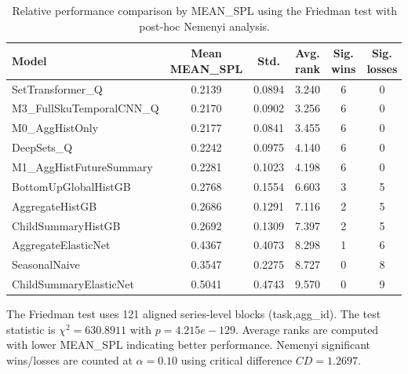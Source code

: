 \begin{table}[H]
\centering
\caption{Relative performance comparison by MEAN_SPL using the Friedman test with post-hoc Nemenyi analysis.}
\label{tab:stats_mean_spl}
\begin{threeparttable}
\begin{tabular}{lccccc}
\toprule
Model & Mean MEAN_SPL & Std. & Avg. rank & Sig. wins & Sig. losses \\
\midrule
SetTransformer\_Q & 0.2139 & 0.0894 & 3.240 & 6 & 0 \\
M3\_FullSkuTemporalCNN\_Q & 0.2170 & 0.0902 & 3.256 & 6 & 0 \\
M0\_AggHistOnly & 0.2177 & 0.0841 & 3.455 & 6 & 0 \\
DeepSets\_Q & 0.2242 & 0.0975 & 4.140 & 6 & 0 \\
M1\_AggHistFutureSummary & 0.2281 & 0.1023 & 4.198 & 6 & 0 \\
BottomUpGlobalHistGB & 0.2768 & 0.1554 & 6.603 & 3 & 5 \\
AggregateHistGB & 0.2686 & 0.1291 & 7.116 & 2 & 5 \\
ChildSummaryHistGB & 0.2692 & 0.1309 & 7.397 & 2 & 5 \\
AggregateElasticNet & 0.4367 & 0.4073 & 8.298 & 1 & 6 \\
SeasonalNaive & 0.3547 & 0.2275 & 8.727 & 0 & 8 \\
ChildSummaryElasticNet & 0.5041 & 0.4743 & 9.570 & 0 & 9 \\
\bottomrule
\end{tabular}
\begin{tablenotes}
\footnotesize \item The Friedman test uses 121 aligned series-level blocks (task,agg\_id). The test statistic is $\chi^2=630.8911$ with $p=4.215e-129$. Average ranks are computed with lower MEAN_SPL indicating better performance. Nemenyi significant wins/losses are counted at $\alpha=0.10$ using critical difference $CD=1.2697$.
\end{tablenotes}
\end{threeparttable}
\end{table}

